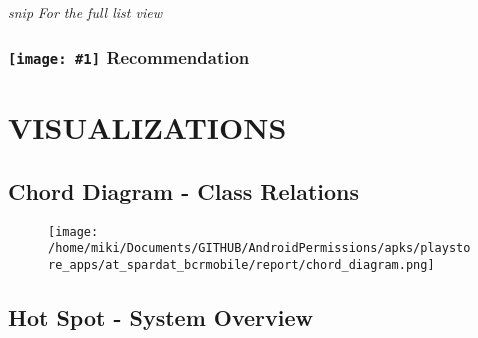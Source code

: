 \documentclass[12p]{article}
\newcommand{\icon}[1]{\texttt{[image: \#1]}}
\begin{document}
\textit{snip}
\newline \textsl{For the full list view }
\subsubsection*{\protect\icon{/home/miki/Documents/GITHUB/AndroidPermissions/python/vulns/report_icons/basic_todo.png} Recommendation}

\cleardoublepage
\newpage
\section{VISUALIZATIONS}
\subsection{Chord Diagram - Class Relations}
\begin{figure}[H]
	\texttt{[image: /home/miki/Documents/GITHUB/AndroidPermissions/apks/playstore\_apps/at\_spardat\_bcrmobile/report/chord\_diagram.png]}\end{figure}\subsection{Hot Spot - System Overview}
\end{document}
